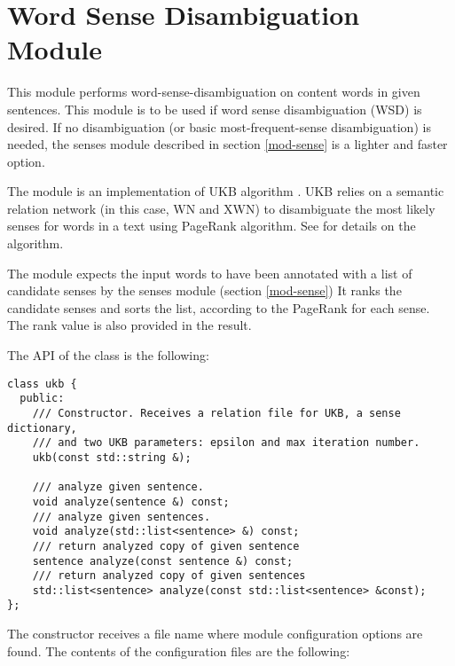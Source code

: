 \documentclass[a4paper]{book}
\begin{document}
\section{Word Sense Disambiguation Module}
\label{mod-ukb}

  This module performs word-sense-disambiguation on content words in
  given sentences. 
  This module is to be used if word sense disambiguation (WSD) is
  desired.  If no disambiguation (or basic most-frequent-sense
  disambiguation) is needed, the senses module described in section
  \ref{mod-sense} is a lighter and faster option.

  The module is an implementation of UKB algorithm \cite{agirre09}.
  UKB relies on a semantic relation network (in this case,
  WN and XWN) to disambiguate the most likely senses for words in a
  text using PageRank algorithm. See \cite{agirre09} for details on the
  algorithm.

  The module expects the input words to have been annotated with a list 
  of candidate senses by the senses module (section \ref{mod-sense})
  It ranks the candidate senses and sorts the list, according to the 
  PageRank for each sense. The rank value is also provided in the result.

  The API of the class is the following:
\begin{verbatim}
class ukb {
  public:
    /// Constructor. Receives a relation file for UKB, a sense dictionary,
    /// and two UKB parameters: epsilon and max iteration number.
    ukb(const std::string &);
 
    /// analyze given sentence.
    void analyze(sentence &) const;
    /// analyze given sentences.
    void analyze(std::list<sentence> &) const;
    /// return analyzed copy of given sentence
    sentence analyze(const sentence &) const;
    /// return analyzed copy of given sentences
    std::list<sentence> analyze(const std::list<sentence> &const);
};
\end{verbatim}

  The constructor receives a file name where module configuration
  options are found.  The contents of the configuration files are the
  following:
\end{document}
